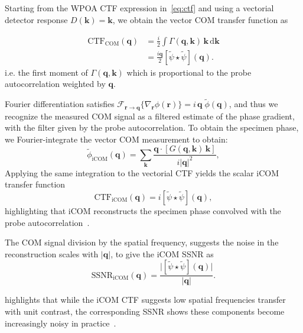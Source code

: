 \documentclass[pdflatex,sn-aps,iicol]{sn-jnl}%
\begin{document}
Starting from the WPOA CTF expression in~\cref{eq:ctf} and using a vectorial detector response $D(\boldsymbol{k}) = \boldsymbol{k}$, we obtain the vector COM transfer function as

\begin{align}
\mathrm{CTF}_{\text{COM}}(\boldsymbol{q})
&=
\frac{i}{2}\int \Gamma(\boldsymbol{q},\boldsymbol{k})\,\boldsymbol{k}\,\mathrm{d}\boldsymbol{k}
\nonumber\\
&=
\frac{i\boldsymbol{q}}{2}[\tilde{\psi}\star\tilde{\psi}](\boldsymbol{q}).
\label{eq:com-ctf}
\end{align}
i.e. the first moment of $\Gamma(\boldsymbol{q},\boldsymbol{k})$ which is proportional to the probe autocorrelation weighted by $\boldsymbol{q}$.

Fourier differentiation satisfies $\mathcal{F}_{\boldsymbol{r} \rightarrow \boldsymbol{q}}\{\nabla_{\boldsymbol{r}} \phi(\boldsymbol{r})\} = i \, \boldsymbol{q} \; \tilde{\phi}(\boldsymbol{q})$, and thus we recognize the measured COM signal as a filtered estimate of the phase gradient, with the filter given by the probe autocorrelation.
To obtain the specimen phase, we Fourier-integrate the vector COM measurement to obtain:
\begin{equation}
\tilde{\phi}_{\text{iCOM}}(\boldsymbol{q})
=
\sum_{\boldsymbol{k}} \frac{\boldsymbol{q}\cdot[G(\boldsymbol{q},\boldsymbol{k})\,\boldsymbol{k}]}{i\lvert \boldsymbol{q} \rvert^2},
\label{eq:icom-recon}
\end{equation}
Applying the same integration to the vectorial CTF yields the scalar iCOM transfer function
\begin{equation}
\mathrm{CTF}_{\text{iCOM}}(\boldsymbol{q})
=
i[\tilde{\psi}\star\tilde{\psi}](\boldsymbol{q}),
\label{eq:icom-ctf}
\end{equation}
highlighting that iCOM reconstructs the specimen phase convolved with the probe autocorrelation~\cite{Bekkevold_2025}.

The COM signal division by the spatial frequency, suggests the noise in the reconstruction scales with $\lvert\boldsymbol{q}\rvert$, to give the iCOM SSNR as~\cite{Varnavides_2025_ssnr}
\begin{equation}
\mathrm{SSNR}_{\text{iCOM}}(\boldsymbol{q})
=
\frac{\lvert [\tilde{\psi}\star\tilde{\psi}](\boldsymbol{q}) \rvert}{\lvert \boldsymbol{q} \rvert}.
\label{eq:icom-ssnr}
\end{equation}

 highlights that while the iCOM CTF suggests low spatial frequencies transfer with unit contrast, the corresponding SSNR shows these components become increasingly noisy in practice~\cite{Varnavides_2023,Yu_2025,Varnavides_2025_ssnr}.
\end{document}
